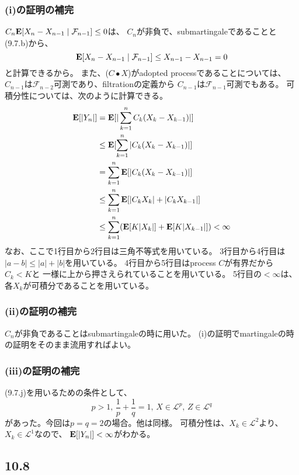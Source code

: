       \subsubsection{(i)の証明の補完}
        $C_n {\mathbf{E}}[X_n - X_{n-1} \mid \mathcal{F}_{n-1}] \leq 0$は、
        $C_n$が非負で、submartingaleであることと(9.7.b)から、
        \[
          {\mathbf{E}}[X_n - X_{n-1} \mid \mathcal{F}_{n-1}] \leq X_{n-1} - X_{n-1} = 0
        \]
        と計算できるから。
        また、($C \bullet X$)がadopted processであることについては、
        $C_{n-1}$は$\mathcal{F}_{n-2}$可測であり、filtrationの定義から
        $C_{n-1}$は$\mathcal{F}_{n-1}$可測でもある。
        可積分性については、次のように計算できる。
        \begin{align*}
          {\mathbf{E}}[|Y_n|]
          &= {\mathbf{E}}[|\sum_{k=1}^n C_k(X_k - X_{k-1})|] \\
          &\leq {\mathbf{E}}[\sum_{k=1}^n | C_k(X_k - X_{k-1})|] \\
          &= \sum_{k=1}^n {\mathbf{E}}[| C_k(X_k - X_{k-1})|] \\
          &\leq \sum_{k=1}^n {\mathbf{E}}[|C_k X_k| + |C_k X_{k-1}|] \\
          &\leq \sum_{k=1}^n ({\mathbf{E}}[K|X_k|] + {\mathbf{E}}[K|X_{k-1}|]) < \infty
        \end{align*}
        なお、ここで1行目から2行目は三角不等式を用いている。
        3行目から4行目は$|a - b| \leq |a| + |b|$を用いている。
        4行目から5行目はprocess $C$が有界だから$C_k < K $と
        一様に上から押さえられていることを用いている。
        5行目の$< \infty$は、各$X_k$が可積分であることを用いている。

      \subsubsection{(ii)の証明の補完}
        $C_n$が非負であることはsubmartingaleの時に用いた。
        (i)の証明でmartingaleの時の証明をそのまま流用すればよい。

      \subsubsection{(iii)の証明の補完}
        (9.7.j)を用いるための条件として、
        \[
          p>1, \, \frac{1}{p} + \frac{1}{q} = 1, \, X \in \mathcal{L}^p, \, Z \in \mathcal{L}^q
        \]
        があった。今回は$p = q =2$の場合。他は同様。
        可積分性は、$X_k \in \mathcal{L}^2$より、$X_k \in \mathcal{L}^1$なので、
        ${\mathbf{E}}[|Y_n|] < \infty$がわかる。

    \subsection{10.8}
